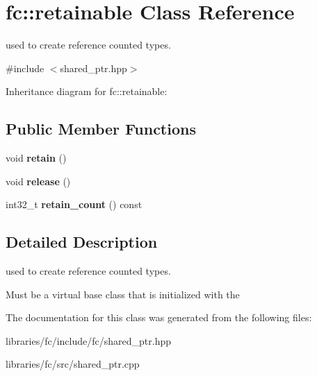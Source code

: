 \hypertarget{classfc_1_1retainable}{}\section{fc\+:\+:retainable Class Reference}
\label{classfc_1_1retainable}


used to create reference counted types.  




{\ttfamily \#include $<$shared\+\_\+ptr.\+hpp$>$}



Inheritance diagram for fc\+:\+:retainable\+:
\subsection*{Public Member Functions}
\begin{DoxyCompactItemize}
\item 
\mbox{\label{classfc_1_1retainable_a2aedc5d60f36c2cd65ad90e8fc3eeaba}} 
void {\bfseries retain} ()
\item 
\mbox{\label{classfc_1_1retainable_a7ab6dcf6c60aa3e0c66c56584c708fa6}} 
void {\bfseries release} ()
\item 
\mbox{\label{classfc_1_1retainable_a8542318aa3db19a57a6543241a1c4eae}} 
int32\+\_\+t {\bfseries retain\+\_\+count} () const
\end{DoxyCompactItemize}


\subsection{Detailed Description}
used to create reference counted types. 

Must be a virtual base class that is initialized with the 

The documentation for this class was generated from the following files\+:\begin{DoxyCompactItemize}
\item 
libraries/fc/include/fc/shared\+\_\+ptr.\+hpp\item 
libraries/fc/src/shared\+\_\+ptr.\+cpp\end{DoxyCompactItemize}
